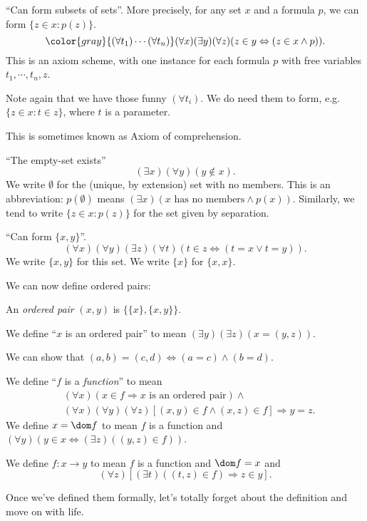\documentclass[a4paper]{article}
\begin{document}
\begin{axiom}
  ``Can form subsets of sets''. More precisely, for any set $x$ and a formula $p$, we can form $\{z\in x: p(z)\}$.
  \[
    {\color{gray}{(\forall t_1)\cdots(\forall t_n)}}(\forall x)(\exists y)(\forall z)(z\in y \Leftrightarrow (z\in x\wedge p)).
  \]
  This is an axiom scheme, with one instance for each formula $p$ with free variables $t_1, \cdots, t_n, z$.

  Note again that we have those funny $(\forall t_i)$. We do need them to form, e.g.\ $\{z\in x: t\in z\}$, where $t$ is a parameter.

  This is sometimes known as Axiom of comprehension.
\end{axiom}
\begin{axiom}
  ``The empty-set exists''
  \[
    (\exists x)(\forall y)(y\not\in x).
  \]
  We write $\emptyset$ for the (unique, by extension) set with no members. This is an abbreviation: $p(\emptyset)$ means $(\exists x)(x\text{ has no members}\wedge p(x))$. Similarly, we tend to write $\{z\in x: p(z)\}$ for the set given by separation.
\end{axiom}
\begin{axiom}
  ``Can form $\{x, y\}$''.
  \[
    (\forall x)(\forall y)(\exists z)(\forall t)(t\in z \Leftrightarrow (t= x\vee t = y)).
  \]
  We write $\{x, y\}$ for this set. We write $\{x\}$ for $\{x, x\}$.
\end{axiom}

We can now define ordered pairs:
\begin{defi}
  An \emph{ordered pair} $(x, y)$ is $\{\{x\}, \{x, y\}\}$.

  We define ``$x$ is an ordered pair'' to mean $(\exists y)(\exists z)(x = (y, z))$.
\end{defi}
We can show that $(a, b) = (c, d) \Leftrightarrow (a = c) \wedge (b = d)$.

\begin{defi}[Function]
  We define ``$f$ is a \emph{function}'' to mean
  \begin{align*}
    & (\forall x)(x\in f\Rightarrow x\text{ is an ordered pair})\wedge\\
    & (\forall x)(\forall y)(\forall z)[(x, y)\in f \wedge (x, z)\in f]\Rightarrow y = z.
  \end{align*}
  We define $x = \dom f$ to mean $f$ is a function and $(\forall y)(y\in x \Leftrightarrow (\exists z)((y, z)\in f))$.

  We define $f: x\to y$ to mean $f$ is a function and $\dom f = x$ and
  \[
    (\forall z)[(\exists t)((t, z)\in f)\Rightarrow z\in y].
  \]
\end{defi}
Once we've defined them formally, let's totally forget about the definition and move on with life.
\end{document}
